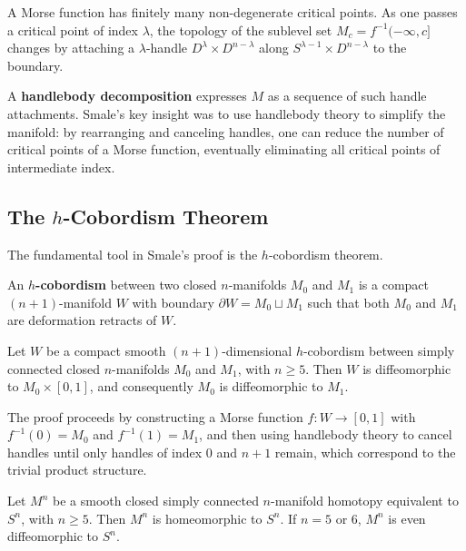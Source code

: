 A Morse function has finitely many non-degenerate critical points. As one passes a critical point of index \(\lambda\), the topology of the sublevel set \(M_c = f^{-1}(-\infty, c]\) changes by attaching a \(\lambda\)-handle \(D^\lambda \times D^{n-\lambda}\) along \(S^{\lambda-1} \times D^{n-\lambda}\) to the boundary.

A \textbf{handlebody decomposition} expresses \(M\) as a sequence of such handle attachments. Smale's key insight was to use handlebody theory to simplify the manifold: by rearranging and canceling handles, one can reduce the number of critical points of a Morse function, eventually eliminating all critical points of intermediate index.

\subsection{The \texorpdfstring{\(h\)}{h}-Cobordism Theorem}

The fundamental tool in Smale's proof is the \(h\)-cobordism theorem.

\begin{definition}
An \textbf{\(h\)-cobordism} between two closed \(n\)-manifolds \(M_0\) and \(M_1\) is a compact \((n+1)\)-manifold \(W\) with boundary \(\partial W = M_0 \sqcup M_1\) such that both \(M_0\) and \(M_1\) are deformation retracts of \(W\).
\end{definition}

\begin{theorem}
Let \(W\) be a compact smooth \((n+1)\)-dimensional \(h\)-cobordism between simply connected closed \(n\)-manifolds \(M_0\) and \(M_1\), with \(n \geq 5\). Then \(W\) is diffeomorphic to \(M_0 \times [0,1]\), and consequently \(M_0\) is diffeomorphic to \(M_1\).
\end{theorem}

The proof proceeds by constructing a Morse function \(f: W \to [0,1]\) with \(f^{-1}(0) = M_0\) and \(f^{-1}(1) = M_1\), and then using handlebody theory to cancel handles until only handles of index 0 and \(n+1\) remain, which correspond to the trivial product structure.

\begin{corollary}
Let \(M^n\) be a smooth closed simply connected \(n\)-manifold homotopy equivalent to \(S^n\), with \(n \geq 5\). Then \(M^n\) is homeomorphic to \(S^n\). If \(n = 5\) or 6, \(M^n\) is even diffeomorphic to \(S^n\).
\end{corollary}

